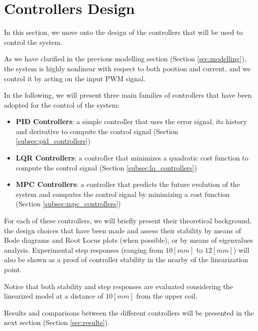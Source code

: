 \section{Controllers Design}
\label{sec:controllers_design}

In this section, we move onto the design of the controllers that will be used to control the system.

As we have clarified in the previous modelling section (Section \ref{sec:modelling}), the system is highly nonlinear with respect to both position and current, and we control it by acting on the input PWM signal.

In the following, we will present three main families of controllers that have been adopted for the control of the system:

\begin{itemize}
    \item \textbf{PID Controllers}: a simple controller that uses the error signal, its history and derivative to compute the control signal (Section \ref{subsec:pid_controllers})
    \item \textbf{LQR Controllers}: a controller that minimizes a quadratic cost function to compute the control signal (Section \ref{subsec:lq_controllers})
    \item \textbf{MPC Controllers}: a controller that predicts the future evolution of the system and computes the control signal by minimizing a cost function (Section \ref{subsec:mpc_controllers})
\end{itemize}

For each of these controllers, we will briefly present their theoretical background, the design choices that have been made and assess their stability by means of Bode diagrams and Root Locus plots (when possible), or by means of eigenvalues analysis.
Experimental step responses (ranging from $10 [mm]$ to $12 [mm]$) will also be shown as a proof of controller stability in the nearby of the linearization point.

Notice that both stability and step responses are evaluated considering the linearized model at a distance of $10 [mm]$ from the upper coil.

Results and comparisons between the different controllers will be presented in the next section (Section \ref{sec:results}).



